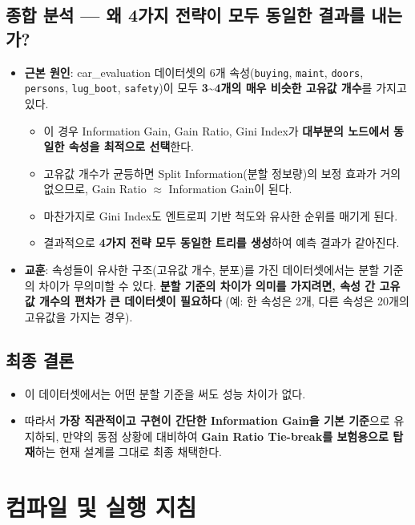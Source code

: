 \documentclass[12pt, a4paper]{article}
\begin{document}
\subsection{종합 분석 --- 왜 4가지 전략이 모두 동일한 결과를 내는가?}

\begin{itemize}
    \item \textbf{근본 원인}: car\_evaluation 데이터셋의 6개 속성(\texttt{buying}, \texttt{maint}, \texttt{doors}, \texttt{persons}, \texttt{lug\_boot}, \texttt{safety})이 모두 \textbf{3\textasciitilde4개의 매우 비슷한 고유값 개수}를 가지고 있다.
    \begin{itemize}
        \item 이 경우 Information Gain, Gain Ratio, Gini Index가 \textbf{대부분의 노드에서 동일한 속성을 최적으로 선택}한다.
        \item 고유값 개수가 균등하면 Split Information(분할 정보량)의 보정 효과가 거의 없으므로, Gain Ratio $\approx$ Information Gain이 된다.
        \item 마찬가지로 Gini Index도 엔트로피 기반 척도와 유사한 순위를 매기게 된다.
        \item 결과적으로 \textbf{4가지 전략 모두 동일한 트리를 생성}하여 예측 결과가 같아진다.
    \end{itemize}
    \item \textbf{교훈}: 속성들이 유사한 구조(고유값 개수, 분포)를 가진 데이터셋에서는 분할 기준의 차이가 무의미할 수 있다. \textbf{분할 기준의 차이가 의미를 가지려면, 속성 간 고유값 개수의 편차가 큰 데이터셋이 필요하다} (예: 한 속성은 2개, 다른 속성은 20개의 고유값을 가지는 경우).
\end{itemize}

\subsection{최종 결론}

\begin{itemize}
    \item 이 데이터셋에서는 어떤 분할 기준을 써도 성능 차이가 없다.
    \item 따라서 \textbf{가장 직관적이고 구현이 간단한 Information Gain을 기본 기준}으로 유지하되, 만약의 동점 상황에 대비하여 \textbf{Gain Ratio Tie-break를 보험용으로 탑재}하는 현재 설계를 그대로 최종 채택한다.
\end{itemize}


\section{컴파일 및 실행 지침}
\end{document}
